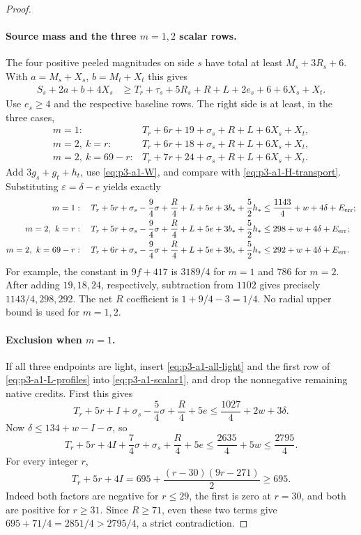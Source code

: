 \documentclass[11pt,letterpaper]{article}
\theoremstyle{definition}\newtheorem{definition}[theorem]{Definition}
\begin{document}
\begin{proof}
\paragraph{Source mass and the three $m=1,2$ scalar rows.}
The four positive peeled magnitudes on side $s$ have total at least
$M_s+3R_s+6$. With $a=M_s+X_s$, $b=M_t+X_t$ this gives
\begin{align}
 S_s+2a+b+4X_s
 &\ge T_r+\tau_s+5R_s+R+L+2e_s+6+6X_s+X_t.
 \label{eq:p3-a1-source-transport}
\end{align}
Use $e_s\ge4$ and the respective baseline rows. The right side is at
least, in the three cases,
\[
 \begin{array}{ll}
 m=1:&T_r+6r+19+\sigma_s+R+L+6X_s+X_t,\\
 m=2,\ k=r:&T_r+6r+18+\sigma_s+R+L+6X_s+X_t,\\
 m=2,\ k=69-r:&T_r+7r+24+\sigma_s+R+L+6X_s+X_t.
 \end{array}
\]
Add $3g_s+g_t+h_t$, use \eqref{eq:p3-a1-W}, and compare with
\eqref{eq:p3-a1-H-transport}. Substituting $\varepsilon=\delta-e$
yields exactly
\begin{align}
 m=1:\quad
 T_r+5r+\sigma_s-\frac94\sigma+\frac R4+L+5e
      +3b_*+\frac52h_*
 &\le\frac{1143}{4}+w+4\delta+E_{\rm err};
 \label{eq:p3-a1-scalar1}\\
 m=2,\ k=r:\quad
 T_r+5r+\sigma_s-\frac94\sigma+\frac R4+L+5e
      +3b_*+\frac52h_*
 &\le298+w+4\delta+E_{\rm err};
 \label{eq:p3-a1-scalar2s}\\
 m=2,\ k=69-r:\quad
 T_r+6r+\sigma_s-\frac94\sigma+\frac R4+L+5e
      +3b_*+\frac52h_*
 &\le292+w+4\delta+E_{\rm err}.
 \label{eq:p3-a1-scalar2t}
\end{align}
For example, the constant in $9f+417$ is $3189/4$ for $m=1$ and
$786$ for $m=2$. After adding $19,18,24$, respectively, subtraction
from $1102$ gives precisely $1143/4,298,292$. The net $R$ coefficient
is $1+9/4-3=1/4$. No radial upper bound is used for $m=1,2$.

\paragraph{Exclusion when $m=1$.}
If all three endpoints are light, insert \eqref{eq:p3-a1-all-light}
and the first row of \eqref{eq:p3-a1-L-profiles} into
\eqref{eq:p3-a1-scalar1}, and drop the nonnegative remaining native
credits. First this gives
\[
 T_r+5r+I+\sigma_s-\frac54\sigma+\frac R4+5e
 \le\frac{1027}{4}+2w+3\delta.
\]
Now $\delta\le134+w-I-\sigma$, so
\begin{equation}\label{eq:p3-a1-m1-light-final}
 T_r+5r+4I+\frac74\sigma+\sigma_s+\frac R4+5e
 \le\frac{2635}{4}+5w\le\frac{2795}{4}.
\end{equation}
For every integer $r$,
\begin{equation}\label{eq:p3-a1-q1}
 T_r+5r+4I=695+\frac{(r-30)(9r-271)}2\ge695.
\end{equation}
Indeed both factors are negative for $r\le29$, the first is zero at
$r=30$, and both are positive for $r\ge31$. Since $R\ge71$, even
these two terms give $695+71/4=2851/4>2795/4$, a strict contradiction.


\end{proof}
\end{document}
